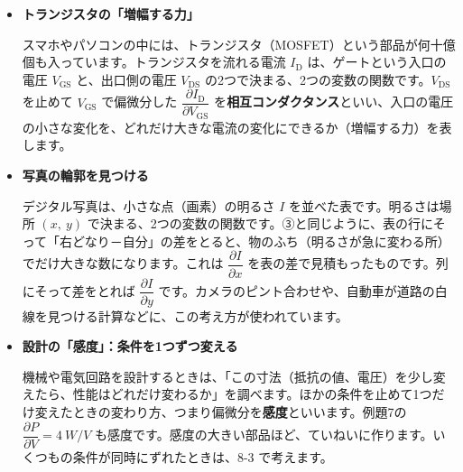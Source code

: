 \begin{butsuri}
\begin{itemize}[leftmargin=1.2\zw, itemsep=3pt, topsep=0pt, label={\color{bkPurple}●}]
\item \textbf{トランジスタの「増幅する力」}\par\noindent スマホやパソコンの中には、トランジスタ（MOSFET）という部品が何十億個も入っています。トランジスタを流れる電流 $I_{\mathrm D}$ は、ゲートという入口の電圧 $V_{\mathrm{GS}}$ と、出口側の電圧 $V_{\mathrm{DS}}$ の2つで決まる、2つの変数の関数です。$V_{\mathrm{DS}}$ を止めて $V_{\mathrm{GS}}$ で偏微分した $\dfrac{\partial I_{\mathrm D}}{\partial V_{\mathrm{GS}}}$ を\textbf{相互コンダクタンス}といい、入口の電圧の小さな変化を、どれだけ大きな電流の変化にできるか（増幅する力）を表します。
\item \textbf{写真の輪郭を見つける}\par\noindent\begin{minipage}[c]{0.6\linewidth}
デジタル写真は、小さな点（画素）の明るさ $I$ を並べた表です。明るさは場所 $(x,\ y)$ で決まる、2つの変数の関数です。③と同じように、表の行にそって「右どなり－自分」の差をとると、物のふち（明るさが急に変わる所）でだけ大きな数になります。これは $\dfrac{\partial I}{\partial x}$ を表の差で見積もったものです。列にそって差をとれば $\dfrac{\partial I}{\partial y}$ です。カメラのピント合わせや、自動車が道路の白線を見つける計算などに、この考え方が使われています。
\end{minipage}\hfill
\begin{minipage}[c]{0.37\linewidth}\centering
{}
\end{minipage}
\item \textbf{設計の「感度」：条件を1つずつ変える}\par\noindent 機械や電気回路を設計するときは、「この寸法（抵抗の値、電圧）を少し変えたら、性能はどれだけ変わるか」を調べます。ほかの条件を止めて1つだけ変えたときの変わり方、つまり偏微分を\textbf{感度}といいます。例題7の $\dfrac{\partial P}{\partial V}=\qty{4}{W/V}$ も感度です。感度の大きい部品ほど、ていねいに作ります。いくつもの条件が同時にずれたときは、8-3 で考えます。
\end{itemize}
\end{butsuri}

